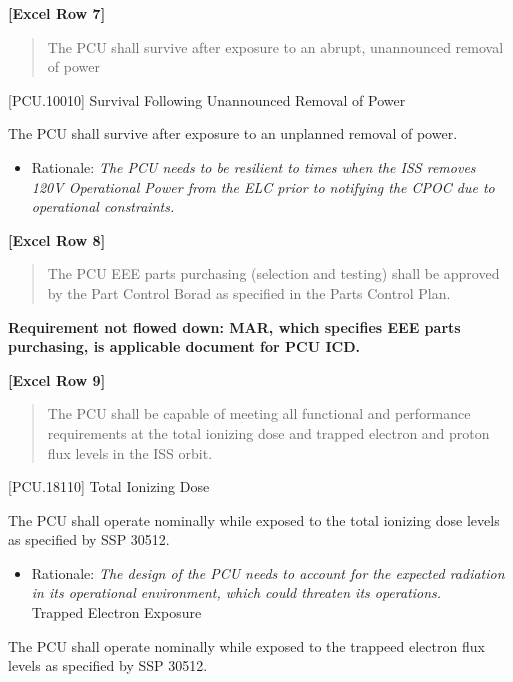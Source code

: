 \textbf{[Excel Row 7]}

\begin{quote}
The PCU shall survive after exposure to an abrupt, unannounced removal of power
\end{quote}

[PCU.10010] Survival Following Unannounced Removal of Power

The PCU shall survive after exposure to an unplanned removal of power.

\begin{itemize}
\item{} Rationale: \emph{The PCU needs to be resilient to times when the ISS removes 120V Operational Power from the ELC prior to notifying the CPOC due to operational constraints.}

\end{itemize}

\textbf{[Excel Row 8]}

\begin{quote}
The PCU EEE parts purchasing (selection and testing) shall be approved by the Part Control Borad as specified in the Parts Control Plan.
\end{quote}

\textbf{Requirement not flowed down: MAR, which specifies EEE parts purchasing, is applicable document for PCU ICD.}

\textbf{[Excel Row 9]}

\begin{quote}
The PCU shall be capable of meeting all functional and performance requirements at the total ionizing dose and trapped electron and proton flux levels in the ISS orbit.
\end{quote}

[PCU.18110] Total Ionizing Dose

The PCU shall operate nominally while exposed to the total ionizing dose levels as specified by SSP 30512.

\begin{itemize}
\item{} Rationale: \emph{The design of the PCU needs to account for the expected radiation in its operational environment, which could threaten its operations.}\\
[PCU.18115] Trapped Electron Exposure

\end{itemize}

The PCU shall operate nominally while exposed to the trappeed electron flux levels as specified by SSP 30512.

